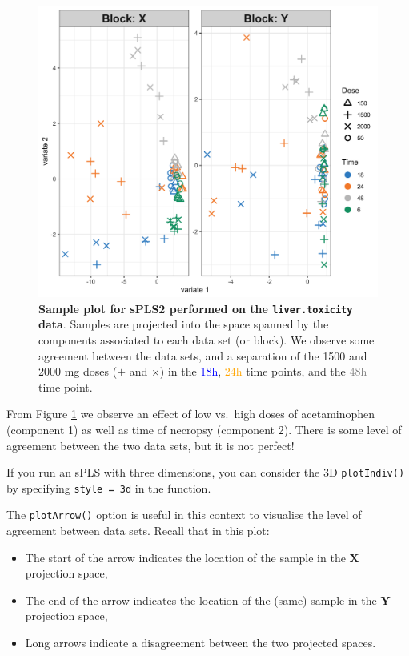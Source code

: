 \documentclass[]{book}
\providecommand{\tightlist}{%
  \setlength{\itemsep}{0pt}\setlength{\parskip}{0pt}}
\begin{document}
\begin{figure}

{\centering \includegraphics[width=0.5\linewidth]{Figures/PLS/spls2-plotIndiv-1} 

}

\caption{\textbf{Sample plot for sPLS2 performed on the \texttt{liver.toxicity} data}. Samples are projected into the space spanned by the components associated to each data set (or block). We observe some agreement between the data sets, and a separation of the 1500 and 2000 mg doses (\(+\) and \(\times\)) in the \textcolor{blue}{18h}, \textcolor{orange}{24h} time points, and the \textcolor{grey}{48h} time point.}\label{fig:spls2-plotIndiv}
\end{figure}



From Figure \ref{fig:spls2-plotIndiv} we observe an effect of low vs.~high doses of acetaminophen (component 1) as well as time of necropsy (component 2). There is some level of agreement between the two data sets, but it is not perfect!

If you run an sPLS with three dimensions, you can consider the 3D \texttt{plotIndiv()} by specifying \texttt{style\ =\ \textquotesingle{}3d\textquotesingle{}} in the function.

The \texttt{plotArrow()} option is useful in this context to visualise the level of agreement between data sets. Recall that in this plot:

\begin{itemize}
\tightlist
\item
  The start of the arrow indicates the location of the sample in the \(\boldsymbol X\) projection space,
\item
  The end of the arrow indicates the location of the (same) sample in the \(\boldsymbol Y\) projection space,
\item
  Long arrows indicate a disagreement between the two projected spaces.
\end{itemize}
\end{document}

